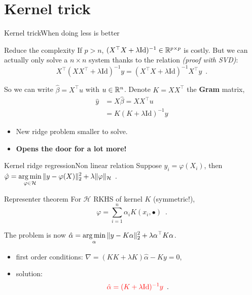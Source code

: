 \documentclass[10pt,aspectratio=43]{beamer}
\begin{document}
\section{Kernel trick}

\begin{frame}{Kernel trick}{When doing less is better}
    \begin{block}{Reduce the complexity}
        If $p>n$, $(X^\top X + \lambda \mathrm{Id})^{-1}\in\mathbb{R}^{p\times p}$ is costly.
        But we can actually only solve a $n\times n$ system thanks to the relation \emph{(proof with SVD)}:
        \[X^\top (X X^\top + \lambda \mathrm{Id})^{-1}y = (X^\top X + \lambda \mathrm{Id})^{-1}X^\top y\enspace.\]
    \end{block}
    \pause
    So we can write $\hat \beta = X^\top u$ with $u\in\mathbb{R}^{n}$. Denote $K=XX^\top$ the \textbf{Gram} matrix,
    \begin{align*}
        \hat y &= X\hat\beta = XX^\top u \\
               &= K(K + \lambda \mathrm{Id})^{-1}y
    \end{align*}

    \begin{itemize}
        \item New ridge problem smaller to solve.
        \item \textbf{Opens the door for a lot more!}
    \end{itemize}
\end{frame}

\begin{frame}{Kernel ridge regression}{Non linear relation}
Suppose $y_i=\varphi(X_i)$, then
 $\hat\varphi = \displaystyle\mathop{\mathrm{arg\,min}}_{\varphi\in\mathcal{H}} \|y-\varphi(X)\|^2_2 + \lambda \|\varphi\|_\mathcal{H}\enspace.$
 \begin{block}{Representer theorem}
        For $\mathcal{H}$ RKHS of kernel $K$ (symmetric!),
     \[\varphi = \sum_{i=1}^n \alpha_i K(x_i, \bullet)\enspace.\]
 \end{block}
 \pause
 The problem is now $\hat\alpha = \displaystyle\mathop{\mathrm{arg\,min}}_{\alpha} \|y-K\alpha\|^2_2 + \lambda \alpha^\top K \alpha$.
 \begin{itemize}
     \item first order conditions: $\nabla=(KK + \lambda K)\hat\alpha - Ky = 0$,
     \item solution: \[\textcolor{red}{\hat\alpha = (K+\lambda\mathrm{Id})^{-1}y} \enspace.\]
 \end{itemize}
\end{frame}
\end{document}
